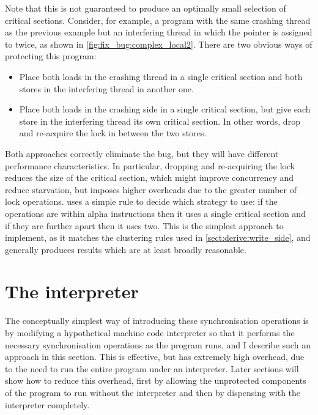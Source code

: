 Note that this is not guaranteed to produce an optimally small
selection of critical sections.  Consider, for example, a program with
the same crashing thread as the previous example but an interfering
thread in which the pointer is assigned to twice, as shown in
\autoref{fig:fix_bug:complex_local2}.  There are two obvious ways of
protecting this program:
\begin{itemize}
\item
  Place both loads in the crashing thread in a single critical section and
  both stores in the interfering thread in another one.
\item
  Place both loads in the crashing side in a single critical section,
  but give each store in the interfering thread its own critical
  section.  In other words, drop and re-acquire the lock in between
  the two stores.
\end{itemize}
Both approaches correctly eliminate the bug, but they will have
different performance characteristics.  In particular, dropping and
re-acquiring the lock reduces the size of the critical section, which
might improve concurrency and reduce starvation, but imposes higher
overheads due to the greater number of lock operations.  {\Technique}
uses a simple rule to decide which strategy to use: if the operations
are within \gls{alpha} instructions then it uses a single critical
section and if they are further apart then it uses two.  This is the
simplest approach to implement, as it matches the clustering rules
used in \autoref{sect:derive:write_side}, and generally produces
results which are at least broadly reasonable.

\section{The interpreter}



The conceptually simplest way of introducing these synchronisation
operations is by modifying a hypothetical machine code interpreter so
that it performs the necessary synchronisation operations as the
program runs, and I describe such an approach in this section.  This
is effective, but has extremely high overhead, due to the need to run
the entire program under an interpreter.  Later sections will show how
to reduce this overhead, first by allowing the unprotected components
of the program to run without the interpreter and then by dispensing
with the interpreter completely.


